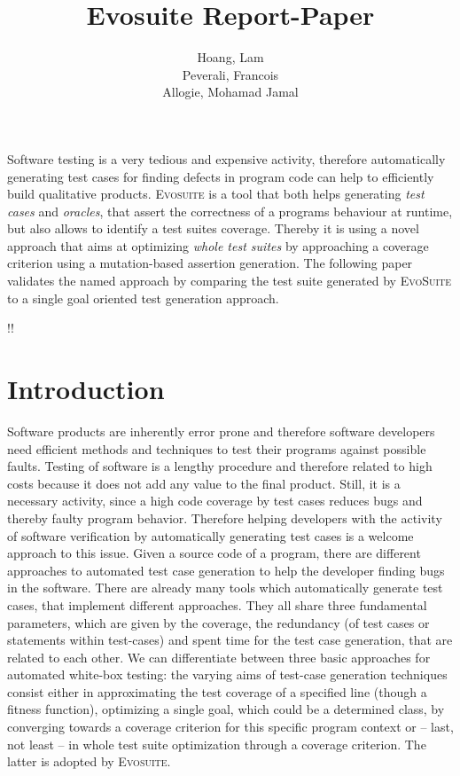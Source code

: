 \documentclass[pdftex,english,oribibl]{llncs}
\title{Evosuite Report-Paper}
\author{Hoang, Lam\\ Peverali, Francois \\ Allogie, Mohamad Jamal}
\institute{Humboldt University of Berlin\\Department of Computer Science\\12489 Berlin, Germany}
\makeatletter
\gdef\@keywords{}
\renewenvironment{abstract}{%
  \list{}{\advance\topsep by0.35cm\relax\small%
          \leftmargin=1cm%
          \labelwidth=\z@%
          \listparindent=\z@%
          \itemindent\listparindent%
          \rightmargin\leftmargin}%
          \item[\hskip\labelsep\bfseries\abstractname]}{%
  \if!\@keywords!\else{\item[~]\item[\hskip\labelsep\bfseries\keywordname]\@keywords}\fi%
  \endlist}
\makeatother
\begin{document}
\maketitle

\begin{abstract}
  Software testing is a very tedious and expensive activity, therefore automatically generating test cases for finding defects in program code can help to efficiently build qualitative products. \textsc{Evosuite} is a tool that both helps generating \textit{test cases} and \textit{oracles}, that assert the correctness of a programs behaviour at runtime, but also allows to identify a test suites coverage. Thereby it is using a novel approach that aims at optimizing \textit{whole test suites} by approaching a coverage criterion using a mutation-based assertion generation. The following paper validates  the named approach by comparing the test suite generated by \textsc{EvoSuite} to a single goal oriented test generation approach.
  
\end{abstract}

\section{Introduction}

Software products are inherently error prone and therefore software developers need efficient methods and techniques to test their programs against possible faults. Testing of software is a lengthy procedure and therefore related to high costs because it does not add any value to the final product. Still, it is a necessary activity, since a high code coverage by test cases reduces bugs and thereby faulty program behavior. Therefore helping developers with the activity of software verification by automatically generating test cases is a welcome approach to this issue.
Given a source code of a program, there are different approaches to automated test case generation to help the developer finding bugs in the software. There are already many tools which automatically generate test cases, that implement different approaches. They all share three fundamental parameters, which are given by the coverage, the redundancy (of test cases or statements within test-cases) and spent time for the test case generation, that are related to each other. We can differentiate between three basic approaches for automated white-box testing: the varying aims of test-case generation techniques consist either in approximating the test coverage of a specified line (though a fitness function), optimizing a single goal, which could be a determined class, by converging towards a coverage criterion for this specific program context or -- last, not least -- in whole test suite optimization through a coverage criterion. The latter is adopted by \textsc{Evosuite}. 
 
\end{document}
